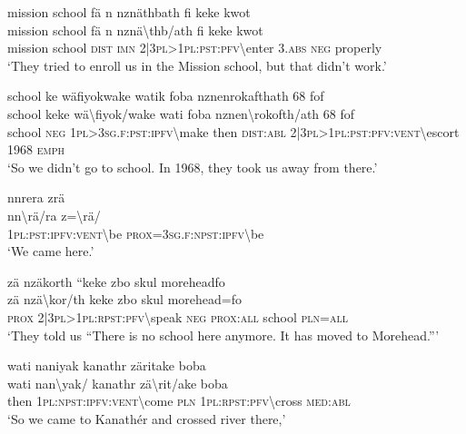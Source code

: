 \ea\label{ex:14:a3079}
mission school fä n nznäthbath fi keke kwot\\
\gll mission	school	fä	n	nznä{\textbackslash}thb/ath	fi	keke	kwot\\
     mission	school	\textsc{dist}	\textsc{imn}	2|3\textsc{pl}>1\textsc{pl}:\textsc{pst}:\textsc{pfv}{\textbackslash}enter	3.\textsc{abs}	\textsc{neg}	properly\\
\glt `They tried to enroll us in the Mission school, but that didn't work.'
\z

\ea\label{ex:14:a3080}
school ke wäfiyokwake watik foba nznenrokafthath 68 fof\\
\gll school	keke	wä{\textbackslash}fiyok/wake	wati	foba	nznen{\textbackslash}rokofth/ath	68	fof\\
     school	\textsc{neg}	1\textsc{pl}>3\textsc{sg}.\textsc{f}:\textsc{pst}:\textsc{ipfv}{\textbackslash}make	then	\textsc{dist}:\textsc{abl}	2|3\textsc{pl}>1\textsc{pl}:\textsc{pst}:\textsc{pfv}:\textsc{vent}{\textbackslash}escort	1968	\textsc{emph}\\
\glt `So we didn't go to school. In 1968, they took us away from there.'
\z

\ea\label{ex:14:a3082}
nnrera zrä\\
\gll nn{\textbackslash}rä/ra	z={\textbackslash}rä/\\
     1\textsc{pl}:\textsc{pst}:\textsc{ipfv}:\textsc{vent}{\textbackslash}be	\textsc{prox}=3\textsc{sg}.\textsc{f}:\textsc{npst}:\textsc{ipfv}{\textbackslash}be\\
\glt `We came here.'
\z

\ea\label{ex:14:a3083}
zä nzäkorth ``keke zbo skul moreheadfo\\
\gll zä	nzä{\textbackslash}kor/th	keke	zbo	skul	morehead=fo\\
     \textsc{prox}	2|3\textsc{pl}>1\textsc{pl}:\textsc{rpst}:\textsc{pfv}{\textbackslash}speak	\textsc{neg}	\textsc{prox}:\textsc{all}	school	\textsc{pln}=\textsc{all}\\
\glt `They told us ``There is no school here anymore. It has moved to Morehead.'''
\z

\newpage
\ea\label{ex:14:a3085}
wati naniyak kanathr zäritake boba\\
\gll wati	nan{\textbackslash}yak/	kanathr	zä{\textbackslash}rit/ake	boba\\
     then	1\textsc{pl}:\textsc{npst}:\textsc{ipfv}:\textsc{vent}{\textbackslash}come	\textsc{pln}	1\textsc{pl}:\textsc{rpst}:\textsc{pfv}{\textbackslash}cross	\textsc{med}:\textsc{abl}\\
\glt `So we came to Kanathér and crossed river there,'
\z

